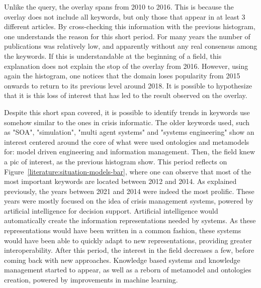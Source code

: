 Unlike the query, the overlay spans from 2010 to 2016. This is because the overlay does not include all keywords, but only those that appear in at least 3 different articles.
By cross-checking this information with the previous histogram, one understands the reason for this short period.
For many years the number of publications was relatively low, and apparently without any real consensus among the keywords.
If this is understandable at the beginning of a field, this explanation does not explain the stop of the overlay from 2016.
However, using again the histogram, one notices that the domain loses popularity from 2015 onwards to return to its previous level around 2018.
It is possible to hypothesize that it is this loss of interest that has led to the result observed on the overlay.

Despite this short span covered, it is possible to identify trends in keywords use somehow similar to the ones in crisis informatic.
The older keywords used, such as "SOA", "simulation", "multi agent systems" and "systems engineering" show an interest centered around the core of what were used ontologies and metamodels for: model driven engineering and information management.
Then, the field knew a pic of interest, as the previous histogram show.
This period reflects on Figure~\ref{literature:situation-models-bar}, where one can observe that most of the most important keywords are located between 2012 and 2014.
As explained previously, the years between 2021 and 2014 were indeed the most prolific.
These years were mostly focused on the idea of crisis management systems, powered by artificial intelligence for decision support.
Artificial intelligence would automatically create the information representations needed by systems.
As these representations would have been written in a common fashion, these systems would have been able to quickly adapt to new representations, providing greater interoperability.
After this period, the interest in the field decreases a few, before coming back with new approaches.
Knowledge based systems and knowledge management started to appear, as well as a reborn of metamodel and ontologies creation, powered by improvements in machine learning.

